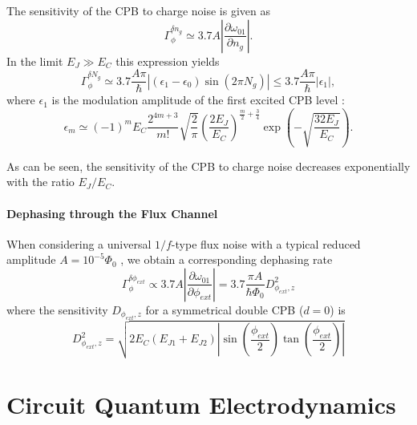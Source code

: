 The sensitivity of the CPB to charge noise is given as	
%
\begin{equation}
\Gamma_\phi^{\delta n_g} \simeq 3.7A \left|\frac{\partial \omega_{01}}{\partial n_g}\right|.
\end{equation}
%
In the limit $E_J\gg E_C$ this expression yields
%
\begin{equation}
\Gamma_\phi^{\delta N_g} \simeq 3.7\frac{A\pi}{\hbar}\left| (\epsilon_1-\epsilon_0)\sin{\left(2\pi N_g\right)}\right| \leq 3.7\frac{A\pi}{\hbar}|\epsilon_1|,
\end{equation}
%
where $\epsilon_1$ is the modulation amplitude of the first excited CPB level \citep{koch_charge-insensitive_2007}:
%
\begin{equation}
\epsilon_m\simeq (-1)^m E_C\frac{2^{4m+3}}{m!}\sqrt{\frac{2}{\pi}}\left(\frac{2E_J}{E_C}\right)^{\frac{m}{2}+\frac{3}{4}}\exp{\left(-\sqrt{\frac{32E_J}{E_C}}\right)}. \label{eq:charge_dephasing_rate}
\end{equation}
%

As can be seen, the sensitivity of the CPB to charge noise decreases exponentially with the ratio $E_J/E_C$.

\paragraph{Dephasing through the Flux Channel}

When considering a universal $1/f$-type flux noise with a typical reduced amplitude $A=10^{-5}\Phi_0$ \citep{koch_charge-insensitive_2007}, we obtain a corresponding dephasing rate
%
\begin{equation}
\Gamma_\phi^{\delta \phi_{ext}} \propto 3.7A\left|\frac{\partial \omega_{01}}{\partial \phi_{ext}}\right| = 3.7\frac{\pi A}{\hbar \Phi_0}D_{\phi_{ext},z}^2 \label{eq:flux_dephasing_rate}
\end{equation}
%
where the sensitivity $D_{\phi_{ext},z}$ for a symmetrical double CPB ($d=0$) is
%
\begin{equation}
D_{\phi_{ext},z}^2 = \sqrt{2E_C(E_{J1}+E_{J2})\left|\sin{\left(\frac{\phi_{ext}}{2}\right)}\tan{\left(\frac{\phi_{ext}}{2}\right)}\right|} \label{eq:flux_dephasing_sensitivity}
\end{equation}
%

\section{Circuit Quantum Electrodynamics}

